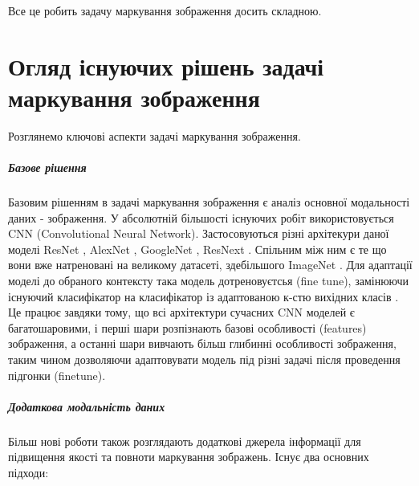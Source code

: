 \documentclass{udstu}
\begin{document}
Все це робить задачу маркування зображення досить складною.


\chapter{Огляд існуючих рішень задачі маркування зображення}

Розглянемо ключові аспекти задачі маркування зображення.

\paragraph{\textbf{Базове рішення}\\}

Базовим рішенням в задачі маркування зображення є аналіз основної модальності даних - зображення.
У абсолютній більшості існуючих робіт використовується CNN (Convolutional Neural Network).
Застосовуються різні архітекури даної моделі ResNet \cite{resnet}, AlexNet \cite{alexnet},
GoogleNet \cite{googlenet}, ResNext \cite{resnext}.
Спільним між ним є те що вони вже натреновані на великому датасеті, здебільшого ImageNet \cite{deng2009imagenet}.
Для адаптації моделі до обраного контексту така модель дотреновуєтсья (fine tune), замінюючи існуючий класифікатор
на класифікатор із адаптованою к-стю вихідних класів \cite{cnn-labeling}.
Це працює завдяки тому, що всі архітектури сучасних CNN моделей є багатошаровими,
і перші шари розпізнають базові особливості (features) зображення, а
останні шари вивчають більш глибинні особливості зображення,
таким чином дозволяючи адаптовувати модель під різні задачі після проведення підгонки (finetune).

\paragraph{\textbf{Додаткова модальність даних}\\}

Більш нові роботи також розглядають додаткові джерела інформації для підвищення якості та повноти
маркування зображень. Існує два основних підходи:
\end{document}
